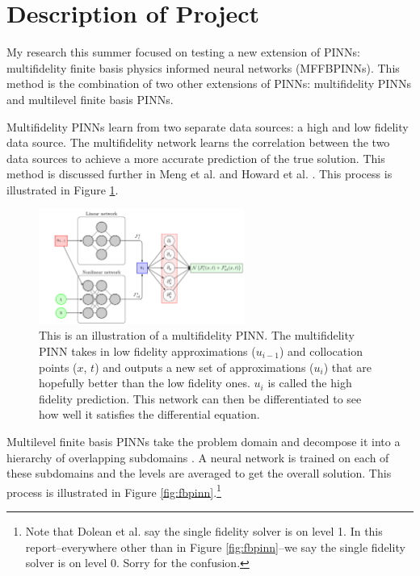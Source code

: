 \documentclass[12pt]{article}
\begin{document}
\section{Description of Project}
\par My research this summer focused on testing a new extension of PINNs: multifidelity finite basis physics informed neural networks (MFFBPINNs). This method is the combination of two other extensions of PINNs: multifidelity PINNs and multilevel finite basis PINNs.
\par Multifidelity PINNs learn from two separate data sources: a high and low fidelity data source. The multifidelity network learns the correlation between the two data sources to achieve a more accurate prediction of the true solution. This method is discussed further in Meng et al. \cite{mfpinns} and Howard et al. \cite{mfdeeponets}. This process is illustrated in Figure \ref{fig:mfpinn}.

\begin{figure}[h]
\center
\includegraphics[width = 0.6\textwidth]{imgs/mfpinns2}
\caption{This is an illustration of a multifidelity PINN. The multifidelity PINN takes in low fidelity approximations ($u_{i-1}$) and collocation points ($x$, $t$) and outputs a new set of approximations ($u_i$) that are hopefully better than the low fidelity ones. $u_i$ is called the high fidelity prediction. This network can then be differentiated to see how well it satisfies the differential equation.}
\label{fig:mfpinn}
\end{figure} 

\par Multilevel finite basis PINNs take the problem domain and decompose it into a hierarchy of overlapping subdomains \cite{fbpinns}. A neural network is trained on each of these subdomains and the levels are averaged to get the overall solution. This process is illustrated in Figure \ref{fig:fbpinn}.\footnote{Note that Dolean et al. \cite{fbpinns} say the single fidelity solver is on level 1. In this report--everywhere other than in Figure \ref{fig:fbpinn}--we say the single fidelity solver is on level 0. Sorry for the confusion.}
\end{document}

